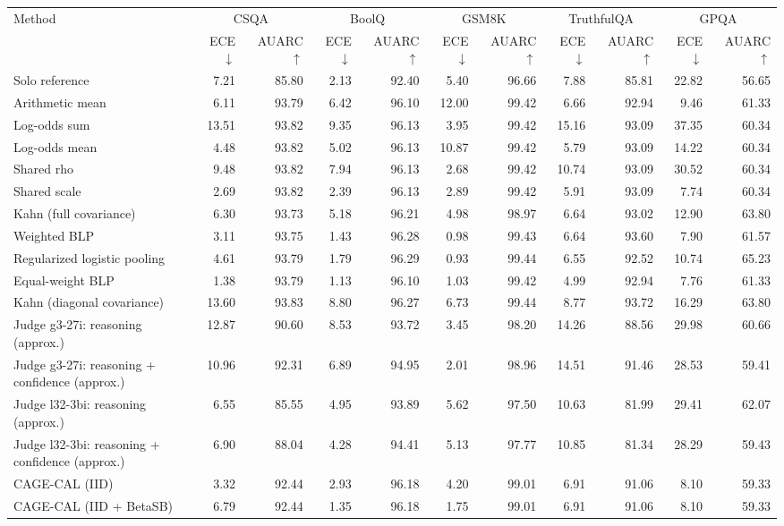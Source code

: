 \begin{tabular}{lrrrrrrrrrr}
\toprule
Method & \multicolumn{2}{c}{CSQA} & \multicolumn{2}{c}{BoolQ} & \multicolumn{2}{c}{GSM8K} & \multicolumn{2}{c}{TruthfulQA} & \multicolumn{2}{c}{GPQA} \\
 & ECE $\downarrow$ & AUARC $\uparrow$ & ECE $\downarrow$ & AUARC $\uparrow$ & ECE $\downarrow$ & AUARC $\uparrow$ & ECE $\downarrow$ & AUARC $\uparrow$ & ECE $\downarrow$ & AUARC $\uparrow$ \\
\midrule
Solo reference & 7.21 & 85.80 & 2.13 & 92.40 & 5.40 & 96.66 & 7.88 & 85.81 & 22.82 & 56.65 \\
Arithmetic mean & 6.11 & 93.79 & 6.42 & 96.10 & 12.00 & 99.42 & 6.66 & 92.94 & 9.46 & 61.33 \\
Log-odds sum & 13.51 & 93.82 & 9.35 & 96.13 & 3.95 & 99.42 & 15.16 & 93.09 & 37.35 & 60.34 \\
Log-odds mean & 4.48 & 93.82 & 5.02 & 96.13 & 10.87 & 99.42 & 5.79 & 93.09 & 14.22 & 60.34 \\
Shared rho & 9.48 & 93.82 & 7.94 & 96.13 & 2.68 & 99.42 & 10.74 & 93.09 & 30.52 & 60.34 \\
Shared scale & 2.69 & 93.82 & 2.39 & 96.13 & 2.89 & 99.42 & 5.91 & 93.09 & 7.74 & 60.34 \\
Kahn (full covariance) & 6.30 & 93.73 & 5.18 & 96.21 & 4.98 & 98.97 & 6.64 & 93.02 & 12.90 & 63.80 \\
Weighted BLP & 3.11 & 93.75 & 1.43 & 96.28 & 0.98 & 99.43 & 6.64 & 93.60 & 7.90 & 61.57 \\
Regularized logistic pooling & 4.61 & 93.79 & 1.79 & 96.29 & 0.93 & 99.44 & 6.55 & 92.52 & 10.74 & 65.23 \\
Equal-weight BLP & 1.38 & 93.79 & 1.13 & 96.10 & 1.03 & 99.42 & 4.99 & 92.94 & 7.76 & 61.33 \\
Kahn (diagonal covariance) & 13.60 & 93.83 & 8.80 & 96.27 & 6.73 & 99.44 & 8.77 & 93.72 & 16.29 & 63.80 \\
Judge g3-27i: reasoning (approx.) & 12.87 & 90.60 & 8.53 & 93.72 & 3.45 & 98.20 & 14.26 & 88.56 & 29.98 & 60.66 \\
Judge g3-27i: reasoning + confidence (approx.) & 10.96 & 92.31 & 6.89 & 94.95 & 2.01 & 98.96 & 14.51 & 91.46 & 28.53 & 59.41 \\
Judge l32-3bi: reasoning (approx.) & 6.55 & 85.55 & 4.95 & 93.89 & 5.62 & 97.50 & 10.63 & 81.99 & 29.41 & 62.07 \\
Judge l32-3bi: reasoning + confidence (approx.) & 6.90 & 88.04 & 4.28 & 94.41 & 5.13 & 97.77 & 10.85 & 81.34 & 28.29 & 59.43 \\
CAGE-CAL (IID) & 3.32 & 92.44 & 2.93 & 96.18 & 4.20 & 99.01 & 6.91 & 91.06 & 8.10 & 59.33 \\
CAGE-CAL (IID + BetaSB) & 6.79 & 92.44 & 1.35 & 96.18 & 1.75 & 99.01 & 6.91 & 91.06 & 8.10 & 59.33 \\
\bottomrule
\end{tabular}
